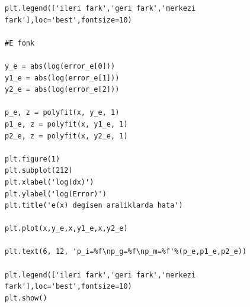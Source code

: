 \documentclass[paper=a4, fontsize=11pt]{scrartcl} %
\numberwithin{equation}{section} %
\numberwithin{figure}{section} %
\numberwithin{table}{section} %
\begin{document}
\begin{lstlisting}
plt.legend(['ileri fark','geri fark','merkezi fark'],loc='best',fontsize=10)

#E fonk

y_e = abs(log(error_e[0]))
y1_e = abs(log(error_e[1]))
y2_e = abs(log(error_e[2]))

p_e, z = polyfit(x, y_e, 1)
p1_e, z = polyfit(x, y1_e, 1)
p2_e, z = polyfit(x, y2_e, 1)

plt.figure(1)
plt.subplot(212)
plt.xlabel('log(dx)')
plt.ylabel('log(Error)')
plt.title('e(x) degisen araliklarda hata')

plt.plot(x,y_e,x,y1_e,x,y2_e)

plt.text(6, 12, 'p_i=%f\np_g=%f\np_m=%f'%(p_e,p1_e,p2_e))

plt.legend(['ileri fark','geri fark','merkezi fark'],loc='best',fontsize=10)
plt.show()
\end{lstlisting}
\fi
\end{document}
